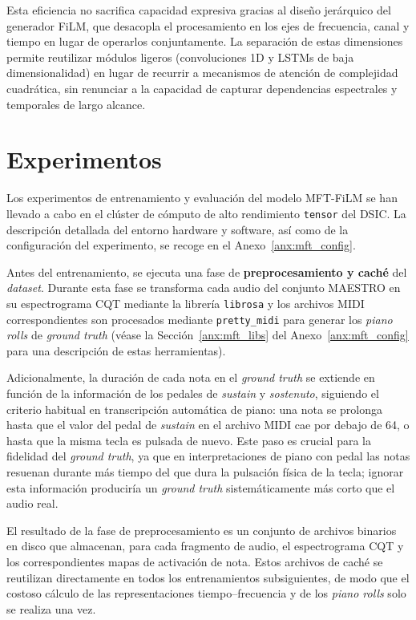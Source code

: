 \documentclass[11pt,spanish,listoffigures,listoftables]{tfgetsinf}
\begin{document}
Esta eficiencia no sacrifica capacidad expresiva gracias al diseño jerárquico del generador FiLM, que desacopla el procesamiento en los ejes de frecuencia, canal y tiempo en lugar de operarlos conjuntamente. La separación de estas dimensiones permite reutilizar módulos ligeros (convoluciones 1D y LSTMs de baja dimensionalidad) en lugar de recurrir a mecanismos
de atención de complejidad cuadrática, sin renunciar a la capacidad de capturar dependencias espectrales y temporales de largo alcance.


\section{Experimentos}
\label{sec:mft_exp_resultados}

Los experimentos de entrenamiento y evaluación del modelo MFT-FiLM se han llevado a cabo en el clúster de cómputo 
de alto rendimiento \texttt{tensor} del DSIC. La descripción 
detallada del entorno hardware y software, así como de la configuración del experimento, se recoge en el 
Anexo~\ref{anx:mft_config}.

Antes del entrenamiento, se ejecuta una fase de \textbf{preprocesamiento y caché} del \textit{dataset}. Durante 
esta fase se transforma cada audio del conjunto MAESTRO en su espectrograma CQT mediante la librería \texttt{librosa} 
y los archivos MIDI correspondientes son procesados mediante \texttt{pretty\_midi} para generar los \textit{piano rolls} 
de \textit{ground truth} (véase la Sección~\ref{anx:mft_libs} del Anexo~\ref{anx:mft_config} para una descripción 
de estas herramientas).

Adicionalmente, la duración de cada nota en el \textit{ground truth} se extiende en función de la información 
de los pedales de \textit{sustain} y \textit{sostenuto}, siguiendo el criterio habitual en transcripción 
automática de piano: una nota se prolonga hasta que el valor del pedal de \textit{sustain} en el archivo MIDI 
cae por debajo de 64, o hasta que la misma tecla es pulsada de nuevo. Este paso es crucial para la fidelidad 
del \textit{ground truth}, ya que en interpretaciones de piano con pedal las notas resuenan durante más tiempo 
del que dura la pulsación física de la tecla; ignorar esta información produciría un \textit{ground truth} 
sistemáticamente más corto que el audio real.

El resultado de la fase de preprocesamiento es un conjunto de archivos binarios en disco que almacenan, 
para cada fragmento de audio, el espectrograma CQT y los correspondientes mapas de activación de nota. 
Estos archivos de caché se reutilizan directamente en todos los entrenamientos subsiguientes, de modo que 
el costoso cálculo de las representaciones tiempo--frecuencia y de los \textit{piano rolls} solo se realiza una vez.
\end{document}

